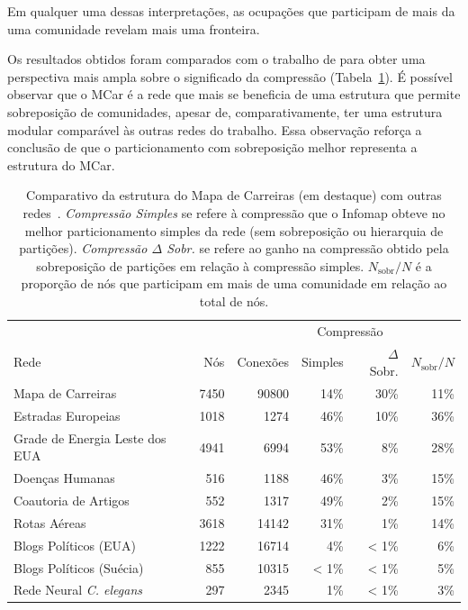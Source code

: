 \documentclass[
  article,
  11pt,
  a4paper,
  english,
  brazil,
  sumario=tradicional]{abntex2}
\begin{document}
Em qualquer uma dessas interpretações, as ocupações que participam de mais da uma comunidade revelam mais uma fronteira.

Os resultados obtidos foram comparados com o trabalho de  para obter uma perspectiva mais ampla sobre o significado da compressão (Tabela~\ref{tab:comparativo}). É possível observar que o MCar é a rede que mais se beneficia de uma estrutura que permite sobreposição de comunidades, apesar de, comparativamente, ter uma estrutura modular comparável às outras redes do trabalho. Essa observação reforça a conclusão de que o particionamento com sobreposição melhor representa a estrutura do MCar.

\begin{table}
  \centering
  \begin{tabular}{@{} l r r r r r @{}}
    \toprule
                                           &      &          & \multicolumn{2}{c}{Compressão} & \\
    \cmidrule(r){4-5}
    Rede                                   & Nós  & Conexões & Simples & $\Delta$ Sobr.       & $N_{\text{sobr}}/N$ \\
    \midrule
    \rowcolor{yellow!25} Mapa de Carreiras & 7450 & 90800    & 14\%    & 30\%                 & 11\% \\
    Estradas Europeias                     & 1018 & 1274     & 46\%    & 10\%                 & 36\% \\
    Grade de Energia Leste dos EUA         & 4941 & 6994     & 53\%    & 8\%                  & 28\% \\
    Doenças Humanas                        & 516  & 1188     & 46\%    & 3\%                  & 15\% \\
    Coautoria de Artigos                   & 552  & 1317     & 49\%    & 2\%                  & 15\% \\
    Rotas Aéreas                           & 3618 & 14142    & 31\%    & 1\%                  & 14\% \\
    Blogs Políticos (EUA)                  & 1222 & 16714    & 4\%     & < 1\%                & 6\% \\
    Blogs Políticos (Suécia)               & 855  & 10315    & < 1\%   & < 1\%                & 5\% \\
    Rede Neural \textit{C. elegans}        & 297  & 2345     & 1\%     & < 1\%                & 3\% \\
    \bottomrule
  \end{tabular}
  \caption{Comparativo da estrutura do Mapa de Carreiras (em destaque) com outras redes~\cite{Viamontes_Esquivel2011-it}. \textit{Compressão Simples} se refere à compressão que o Infomap obteve no melhor particionamento simples da rede (sem sobreposição ou hierarquia de partições). \textit{Compressão $\Delta$ Sobr.} se refere ao ganho na compressão obtido pela sobreposição de partições em relação à compressão simples. $N_{\text{sobr}}/N$ é a proporção de nós que participam em mais de uma comunidade em relação ao total de nós.}
  \label{tab:comparativo}
\end{table}
\end{document}
